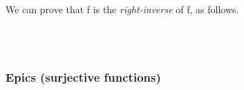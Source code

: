 \ccpad
We can prove that  \ab f is the \emph{right-inverse} of \ab f, as follows. %
\ccpad
\begin{code}%
\>[1]\AgdaSpace{}%
\AgdaSymbol{:}\AgdaSpace{}%
\AgdaSymbol{(}\AgdaSpace{}%
\AgdaSymbol{:}\AgdaSpace{}%
\AgdaSpace{}%
\AgdaSpace{}%
\AgdaSymbol{)\{}\AgdaSpace{}%
\AgdaSymbol{:}\AgdaSpace{}%
\AgdaSymbol{\}(}\AgdaSpace{}%
\AgdaSymbol{:}\AgdaSpace{}%
\AgdaSpace{}%
\AgdaSpace{}%
\AgdaSpace{}%
\AgdaSymbol{)}\AgdaSpace{}%
\AgdaSpace{}%
\AgdaSymbol{(}\AgdaSpace{}%
\AgdaSpace{}%
\AgdaSymbol{)}\AgdaSpace{}%
\AgdaSpace{}%
\<%
\\
%
\>[1]\AgdaSpace{}%
\AgdaSpace{}%
\AgdaSymbol{\{}\AgdaSpace{}%
\AgdaDottedPattern{\AgdaSymbol{)}}\AgdaSymbol{\}}\AgdaSpace{}%
\AgdaSymbol{(}\AgdaSpace{}%
\AgdaSymbol{)}\AgdaSpace{}%
\AgdaSymbol{=}\AgdaSpace{}%
\<%
\\
%
\>[1]\AgdaSpace{}%
\AgdaSpace{}%
\AgdaSymbol{(}\AgdaSpace{}%
\AgdaSymbol{\AgdaUnderscore{}}\AgdaSpace{}%
\AgdaSymbol{\AgdaUnderscore{}}\AgdaSpace{}%
\AgdaSymbol{)}\AgdaSpace{}%
\AgdaSymbol{=}\AgdaSpace{}%
\AgdaSpace{}%
\<%
\end{code}





\subsubsection{Epics (surjective functions)}\label{surjective-functions}

